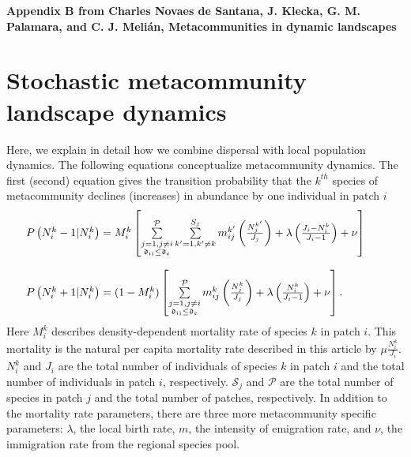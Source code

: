 \documentclass[12pt]{article}
\begin{document}
\clearpage
\begin{flushleft} 
{\Large \textbf{Appendix B from Charles Novaes de Santana, J. Klecka, G. M. Palamara, and C. J. Meli\'{a}n, Metacommunities in dynamic landscapes}}
\end{flushleft}

\renewcommand{\theequation}{B-\arabic{equation}}
\setcounter{equation}{0}
\renewcommand{\thesection}{B\arabic{section}}
\renewcommand{\thefigure}{B\arabic{figure}}
\renewcommand{\thetable}{B\arabic{table}}
\setcounter{figure}{0}
\setcounter{table}{0}

\section*{Stochastic metacommunity landscape dynamics}
\label{Population dispersal model}

Here, we explain in detail how we combine dispersal with local
population dynamics. The following equations conceptualize
metacommunity dynamics. The first (second) equation gives the
transition probability that the $k^{th}$ species of
metacommunity declines (increases) in abundance by one individual in
patch $i$
\begin{equation}
\begin{array}{lcr}
\hspace{-0.25 in}P \left(N_{i}^{k} - 1 | N_{i}^{k} \right) = M^{k}_{i} \left[\sum\limits^{\mathcal{P}}_{\substack{j = 1,j \ne i \\ \mathfrak{d_{ij}} \leq \mathfrak{d_{c}}}}
 \sum\limits_{k'=1,k'\ne k}^{S_{j}} m_{ij}^{k'} \left(\frac{N_{j}^{k'}}{J_{j}}\right) + \lambda \left(\frac{J_{i} - N_{i}^{k}}{J_{i} - 1}\right) + \nu \right]\\[0.5cm]
\\
\hspace{-0.25 in}P \left(N_{i}^{k} + 1 | N_{i}^{k}\right) = (1 - M^{k}_{i}) \left[
\sum\limits^{\mathcal{P}}_{\substack{j = 1,j \ne i \\ \mathfrak{d_{ij}} \leq \mathfrak{d_{c}}}}
 m_{ij}^{k} \left(\frac{N_{j}^{k}}{J_{j}}\right) + \lambda \left(\frac{N_{i}^{k}}{J_{i} - 1}\right) + \nu \right].
\end{array}
\label{master}
\end{equation}
Here $M^{k}_{i}$ describes density-dependent mortality rate of species
$k$ in patch $i$. This mortality is the natural per capita mortality
rate described in this article by $\mu
\frac{N_{i}^{k}}{J_{i}}$. $N_{i}^{k}$ and $J_{i}$ are the total number of
individuals of species $k$ in patch $i$ and the total number of individuals
in patch $i$, respectively. $\mathcal{S}_{j}$ and $\mathcal{P}$ are
the total number of species in patch $j$ and the total number of
patches, respectively. In addition to the mortality rate parameters,
there are three more metacommunity specific parameters: $\lambda$, the
local birth rate, $m$, the intensity of emigration rate, and $\nu$,
the immigration rate from the regional species pool.
\end{document}
